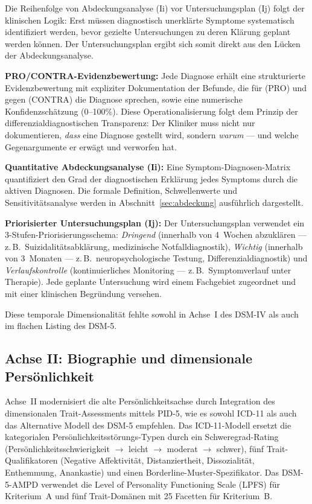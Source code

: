 \documentclass[11pt,a4paper]{article}
\begin{document}
Die Reihenfolge von Abdeckungsanalyse (Ii) vor Untersuchungsplan (Ij) folgt der klinischen Logik: Erst m\"ussen diagnostisch unerkl\"arte Symptome systematisch identifiziert werden, bevor gezielte Untersuchungen zu deren Kl\"arung geplant werden k\"onnen. Der Untersuchungsplan ergibt sich somit direkt aus den L\"ucken der Abdeckungsanalyse.

\textbf{PRO/CONTRA-Evidenzbewertung:} Jede Diagnose erh\"alt eine strukturierte Evidenzbewertung mit expliziter Dokumentation der Befunde, die f\"ur (PRO) und gegen (CONTRA) die Diagnose sprechen, sowie eine numerische Konfidenzsch\"atzung (0--100\%). Diese Operationalisierung folgt dem Prinzip der differenzialdiagnostischen Transparenz: Der Kliniker muss nicht nur dokumentieren, \textit{dass} eine Diagnose gestellt wird, sondern \textit{warum} --- und welche Gegenargumente er erw\"agt und verworfen hat.

\textbf{Quantitative Abdeckungsanalyse (Ii):} Eine Symptom-Diagnosen-Matrix quantifiziert den Grad der diagnostischen Erkl\"arung jedes Symptoms durch die aktiven Diagnosen. Die formale Definition, Schwellenwerte und Sensitivit\"atsanalyse werden in Abschnitt~\ref{sec:abdeckung} ausf\"uhrlich dargestellt.

\textbf{Priorisierter Untersuchungsplan (Ij):} Der Untersuchungsplan verwendet ein 3-Stufen-Priorisierungsschema: \textit{Dringend} (innerhalb von 4~Wochen abzukl\"aren --- z.\,B.\ Suizidalit\"atsabkl\"arung, medizinische Notfalldiagnostik), \textit{Wichtig} (innerhalb von 3~Monaten --- z.\,B.\ neuropsychologische Testung, Differenzialdiagnostik) und \textit{Verlaufskontrolle} (kontinuierliches Monitoring --- z.\,B.\ Symptomverlauf unter Therapie). Jede geplante Untersuchung wird einem Fachgebiet zugeordnet und mit einer klinischen Begr\"undung versehen.

Diese temporale Dimensionalit\"at fehlte sowohl in Achse~I des DSM-IV als auch im flachen Listing des DSM-5.

\subsection{Achse II: Biographie und dimensionale Pers\"onlichkeit}

Achse~II modernisiert die alte Pers\"onlichkeitsachse durch Integration des dimensionalen Trait-Assessments mittels PID-5, wie es sowohl ICD-11 als auch das Alternative Modell des DSM-5 empfehlen. Das ICD-11-Modell ersetzt die kategorialen Pers\"onlichkeitsst\"orungs-Typen durch ein Schweregrad-Rating (Pers\"onlichkeitsschwierigkeit $\to$ leicht $\to$ moderat $\to$ schwer), f\"unf Trait-Qualifikatoren (Negative Affektivit\"at, Distanziertheit, Dissozialit\"at, Enthemmung, Anankastie) und einen Borderline-Muster-Spezifikator. Das DSM-5-AMPD verwendet die Level of Personality Functioning Scale (LPFS) f\"ur Kriterium~A und f\"unf Trait-Dom\"anen mit 25 Facetten f\"ur Kriterium~B.
\end{document}
